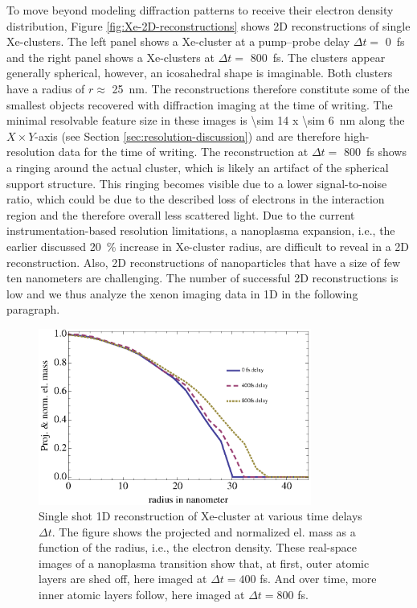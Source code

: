 To move beyond modeling diffraction patterns to receive their electron density distribution, Figure \ref{fig:Xe-2D-reconstructions} shows 2D reconstructions of single Xe-clusters. The left panel shows a Xe-cluster at a pump--probe delay $\Delta t =$ \SI{0}{\femto\second} and the right panel shows a Xe-clusters at $\Delta t=$ \SI{800}{\femto\second}. The clusters appear generally spherical, however, an icosahedral shape is imaginable. Both clusters have a radius of $r\approx$ \SI{25}{\nano\meter}. The reconstructions therefore constitute some of the smallest objects recovered with diffraction imaging at the time of writing. The minimal resolvable feature size in these images is \SI{\sim 14 x \sim 6}{\nano\meter} along the $X \times Y$-axis (see Section \ref{sec:resolution-discussion}) and are therefore high-resolution data for the time of writing. The reconstruction at $\Delta t=$ \SI{800}{\femto\second} shows a ringing around the actual cluster, which is likely an artifact of the spherical support structure. This ringing becomes visible due to a lower signal-to-noise ratio, which could be due to the described loss of electrons in the interaction region and the therefore overall less scattered light. Due to the current instrumentation-based resolution limitations, a nanoplasma expansion, i.e., the earlier discussed \SI{20}{\percent} increase in Xe-cluster radius, are difficult to reveal in a 2D reconstruction. Also, 2D reconstructions of nanoparticles that have a size of few ten nanometers are challenging. The number of successful 2D reconstructions is low and we thus analyze the xenon imaging data in 1D in the following paragraph.\\[1\baselineskip]
\begin{figure}
	\centering
		\includegraphics[width=0.80\textwidth]{images/results/Xe-reconstructions.eps}
	\caption[Single-shot 1D reconstruction of \SI{\sim 30}{\nano\meter} radius Xe-cluster]{Single shot 1D reconstruction of Xe-cluster at various time delays $\Delta t$. The figure shows the projected and normalized el. mass as a function of the radius, i.e., the electron density. These real-space images of a nanoplasma transition show that, at first, outer atomic layers are shed off, here imaged at $\Delta t=400$ fs. And over time, more inner atomic layers follow, here imaged at $\Delta t= 800$ fs.}
	\label{fig:Xe-reconstructions}
\end{figure}
